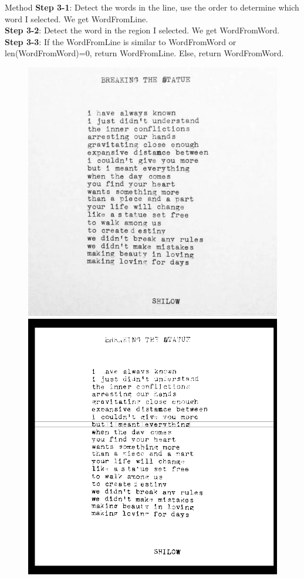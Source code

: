 \documentclass{beamer}
\begin{document}
\begin{frame}{Method}
		\textbf{Step 3-1}: Detect the words in the line, use the order to determine which word I selected. We get WordFromLine.\\
		\textbf{Step 3-2}: Detect the word in the region I selected. We get WordFromWord.\\
		\textbf{Step 3-3}: If the WordFromLine is similar to WordFromWord or len(WordFromWord)=0, return WordFromLine. Else, return WordFromWord.\\
		\begin{figure}[h]
			\centering
			\includegraphics[height=0.4\linewidth]{./img1.jpg}
			\includegraphics[width = 0.4\linewidth]{./raw_done.png}
		\end{figure}
\end{frame}
 
\end{document}
